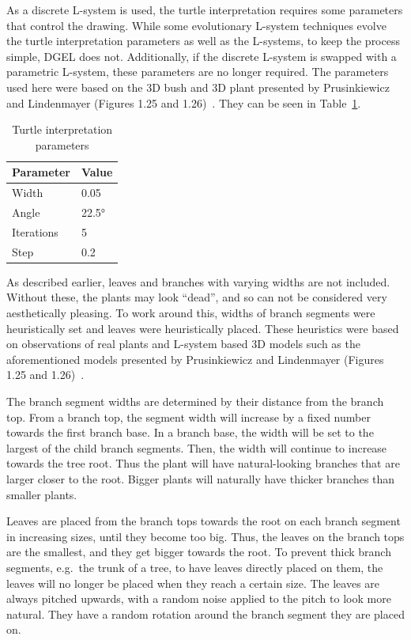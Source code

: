 As a discrete \gls{L-system} is used, the turtle interpretation requires some parameters that control the drawing.
While some evolutionary \gls{L-system} techniques evolve the turtle interpretation parameters as well as the \glspl{L-system}, to keep the process simple, \gls{DGEL} does not.
Additionally, if the discrete \gls{L-system} is swapped with a parametric \gls{L-system}, these parameters are no longer required.
The parameters used here were based on the 3D bush and 3D plant presented by Prusinkiewicz and Lindenmayer (Figures 1.25 and 1.26)~\cite{2012Prusinkiewicz}.
They can be seen in Table~\ref{tab:turtle-param}.

\begin{table}
    \centering
    \begin{tabular}{| l | l |}
    \hline
    \textbf{Parameter} & \textbf{Value} \\ \hline
    Width & 0.05 \\ \hline
    Angle & 22.5° \\ \hline
    Iterations & 5 \\ \hline
    Step & 0.2 \\
    \hline
    \end{tabular}
    \caption{Turtle interpretation parameters}
    \label{tab:turtle-param}
\end{table}

As described earlier, leaves and branches with varying widths are not included.
Without these, the plants may look ``dead'', and so can not be considered very aesthetically pleasing.
To work around this, widths of \glspl{branch segment} were heuristically set and leaves were heuristically placed.
These heuristics were based on observations of real plants and \gls{L-system} based 3D models such as the aforementioned models presented by Prusinkiewicz and Lindenmayer (Figures 1.25 and 1.26)~\cite{2012Prusinkiewicz}.

The \gls{branch segment} widths are determined by their distance from the branch top.
From a branch top, the segment width will increase by a fixed number towards the first \gls{branch base}.
In a \gls{branch base}, the width will be set to the largest of the child \glspl{branch segment}.
Then, the width will continue to increase towards the tree root.
Thus the plant will have natural-looking branches that are larger closer to the root.
Bigger plants will naturally have thicker branches than smaller plants.

Leaves are placed from the branch tops towards the root on each \gls{branch segment} in increasing sizes, until they become too big.
Thus, the leaves on the branch tops are the smallest, and they get bigger towards the root.
To prevent thick \glspl{branch segment}, e.g.\ the trunk of a tree, to have leaves directly placed on them, the leaves will no longer be placed when they reach a certain size.
The leaves are always pitched upwards, with a random noise applied to the pitch to look more natural.
They have a random rotation around the \gls{branch segment} they are placed on.

